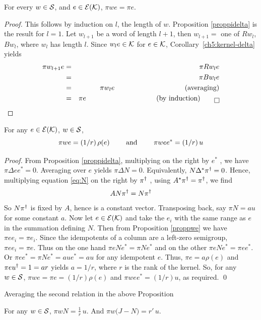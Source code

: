 \begin{proposition} 	\label{prop:6.3}
For every $w\in{\mathcal S}$, and $e\in{\mathcal E }({\mathcal K})$, $\pi we=\pi e$.
\end{proposition}

\begin{proof} This follows by induction on $l$, the length of $w$. Proposition \ref{proppidelta}
is the result for $l=1$. Let $w_{l+1}$ be a word of
length $l+1$, then $w_{l+1}=$ one of $Rw_l$, $Bw_l$, where $w_l$ has length $l$. Since $w_le\in{\mathcal K}$ for $e\in{\mathcal K}$, Corollary~\ref{ch5:kernel-delta} yields 
\begin{eqnarray*}
\pi w_{l+1} e &=&\pi R w_le\cr &=& \pi B w_le \cr &=& \pi w_l e \hbox to 100pt{}{\rm (averaging)}\cr
&=& \pi e \hbox to 100pt{} \hbox{\rm (by induction)}\qed\cr
\end{eqnarray*}
\end{proof} \label{proppwe}

\begin{proposition}  	\label{prop:6.4}
For any $e\in{\mathcal E }({\mathcal K})$, $w\in {\mathcal S}$, 
$$
  \pi we=(1/r)\,\rho(e) \qquad \hbox{\ and\ }
	\qquad\pi w ee^*=(1/r)\,u
$$
%
\end{proposition}

\begin{proof} From Proposition \ref{proppidelta}, 
multiplying on the right by $e^*$ , we have $\pi\Delta ee^* =0$. 
Averaging over $e$ yields $\pi\Delta N = 0$. Equivalently, $N\Delta^*\dg\pi.   = 0$. 
Hence, multiplying equation \eqref{eq:N} on the right by  $\dg\pi.$ , 
using $A^*\dg\pi. = \dg\pi.$, we find
$$
   AN\dg\pi.  = N \dg\pi.
$$
So $N\dg\pi.$  is fixed by $A$, hence is a constant vector. Transposing back, say
$\pi N = au$ for some constant $a$. Now let $e\in {\mathcal E }({\mathcal K})$ and take the $e_i$ with the
same range as $e$ in the summation defining $N$. Then from Proposition \ref{proppwe} we have
$\pi e e_i=\pi e_i$. Since the idempotents of a column are a left-zero semigroup, $\pi ee_i=\pi e$. Thus
on the one hand $ \pi eNe^*=\pi N e^*$
and on the other $\pi eNe^*=\pi ee^*$.
Or $\pi ee^* =\pi Ne^*=aue^*=au$ for any idempotent $e$.  Thus, $\pi e=a\rho(e)$ and
$\pi e\dg u.=1=ar$ yields $a=1/r$, where $r$ is the rank of the kernel. So, for any $w\in{\mathcal S}$,
$\pi we=\pi e = (1/r)\rho(e)$ and $\pi wee^*=(1/r)u$, as required. \qed
\end{proof}

Averaging the second relation in the above Proposition

\begin{corollary} \label{cor:pideltann}  \label{cor:6.3}
For any $w\in{\mathcal S}$,
$\pi w N =\frac{1}{r}\,u$. And $\pi w \bigl(J-N\bigr) =r'\,u$.
\end{corollary}
